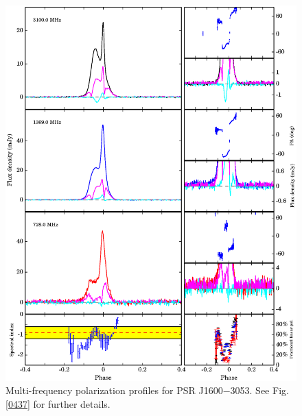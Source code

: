 \documentclass[useAMS,usenatbib]{mn2e}
\begin{document}
%
%
%
%


\begin{figure}
\begin{center}
\includegraphics[width=6 in]{1600.ps}
\caption{Multi-frequency polarization profiles for PSR J1600$-$3053. 
See Fig. \ref{0437} for further details.}
\label{1600}
\end{center}
\end{figure}
\end{document}
